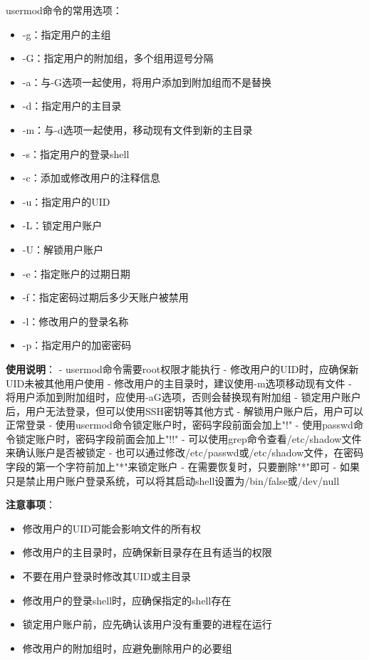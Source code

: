\documentclass[12pt,UTF8]{ctexbook}
\begin{document}
usermod命令的常用选项：
\begin{itemize}
    \item -g：指定用户的主组
    \item -G：指定用户的附加组，多个组用逗号分隔
    \item -a：与-G选项一起使用，将用户添加到附加组而不是替换
    \item -d：指定用户的主目录
    \item -m：与-d选项一起使用，移动现有文件到新的主目录
    \item -s：指定用户的登录shell
    \item -c：添加或修改用户的注释信息
    \item -u：指定用户的UID
    \item -L：锁定用户账户
    \item -U：解锁用户账户
    \item -e：指定账户的过期日期
    \item -f：指定密码过期后多少天账户被禁用
    \item -l：修改用户的登录名称
    \item -p：指定用户的加密密码
\end{itemize}

\textbf{使用说明}：
- usermod命令需要root权限才能执行
- 修改用户的UID时，应确保新UID未被其他用户使用
- 修改用户的主目录时，建议使用-m选项移动现有文件
- 将用户添加到附加组时，应使用-aG选项，否则会替换现有附加组
- 锁定用户账户后，用户无法登录，但可以使用SSH密钥等其他方式
- 解锁用户账户后，用户可以正常登录
- 使用usermod命令锁定账户时，密码字段前面会加上"!"
- 使用passwd命令锁定账户时，密码字段前面会加上"!!"
- 可以使用grep命令查看/etc/shadow文件来确认账户是否被锁定
- 也可以通过修改/etc/passwd或/etc/shadow文件，在密码字段的第一个字符前加上"*"来锁定账户
- 在需要恢复时，只要删除"*"即可
- 如果只是禁止用户账户登录系统，可以将其启动shell设置为/bin/false或/dev/null

\textbf{注意事项}：
\begin{itemize}
    \item 修改用户的UID可能会影响文件的所有权
    \item 修改用户的主目录时，应确保新目录存在且有适当的权限
    \item 不要在用户登录时修改其UID或主目录
    \item 修改用户的登录shell时，应确保指定的shell存在
    \item 锁定用户账户前，应先确认该用户没有重要的进程在运行
    \item 修改用户的附加组时，应避免删除用户的必要组
\end{itemize}
\end{document}
